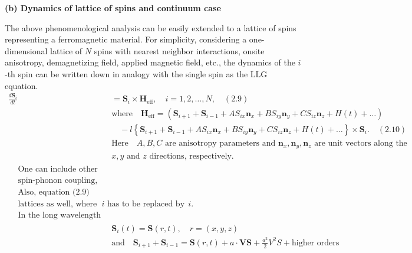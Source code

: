 \documentclass{article}
\begin{document}
	\textbf{(b) Dynamics of lattice of spins and continuum case}
	
	The above phenomenological analysis can be easily extended to a lattice of spins representing a ferromagnetic material. For simplicity, considering a one-dimensional lattice of $N$ spins with nearest neighbor interactions, onsite anisotropy, demagnetizing field, applied magnetic field, etc., the dynamics of the $i$-th spin can be written down in analogy with the single spin as the LLG equation.
	\begin{align}
	\frac{{d\mathbf{S}_i}}{{dt}} &= \mathbf{S}_i \times \mathbf{H}_{\text{eff}}, \quad i = 1, 2, \ldots, N, \quad (2.9) \nonumber \\
	&\text{where} \quad \mathbf{H}_{\text{eff}} = \left( \mathbf{S}_{i+1} + \mathbf{S}_{i-1} + AS_{ix}\mathbf{n}_x + BS_{iy}\mathbf{n}_y + CS_{iz}\mathbf{n}_z + H(t) + \ldots \right) \nonumber \\
	&\quad - l \left\{ \mathbf{S}_{i+1} + \mathbf{S}_{i-1} + AS_{ix}\mathbf{n}_x + BS_{iy}\mathbf{n}_y + CS_{iz}\mathbf{n}_z + H(t) + \ldots \right\} \times \mathbf{S}_i. \quad (2.10) \nonumber \\
	&\text{Here} \quad A, B, C \text{ are anisotropy parameters and } \mathbf{n}_x, \mathbf{n}_y, \mathbf{n}_z \text{ are unit vectors along the} \nonumber \\ 
	&x, y \text{ and } z \text{ directions, respectively.} \nonumber \\
	\begin{split}
	&\text{One can include other types of interactions like biquadratic exchange,} \\
	&\text{spin-phonon coupling, dipole interactions, etc.} \nonumber \\
	&\text{Also, equation (2.9) can be generalized to the case of square and cubic}  \nonumber \\
	&\text{lattices as well, where the index } i \text{ has to be replaced by the appropriate lattice vector } i. \nonumber \\
	&\text{In the long wavelength and low temperature limit, that is in the continuum limit, one can write}
	\end{split} \nonumber \\
	&\mathbf{S}_i(t) = \mathbf{S}(r, t), \quad r = (x, y, z) \nonumber \\
	&\text{and} \quad \mathbf{S}_{i+1} + \mathbf{S}_{i-1} = \mathbf{S}(r, t) + a \cdot \mathbf{VS} + \frac{a^2}{2}V^2S + \text{higher orders} \nonumber \\

\end{align}
\end{document}
